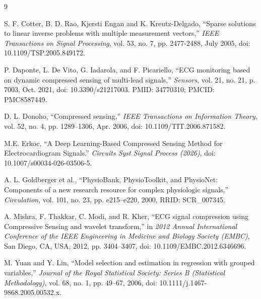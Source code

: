 \begin{thebibliography}{9}

S. F. Cotter, B. D. Rao, Kjersti Engan and K. Kreutz-Delgado, ``Sparse solutions to linear inverse problems with multiple measurement vectors,'' \textit{IEEE Transactions on Signal Processing}, vol. 53, no. 7, pp. 2477-2488, July 2005, doi: 10.1109/TSP.2005.849172.

P. Daponte, L. De Vito, G. Iadarola, and F. Picariello, ``ECG monitoring based on dynamic compressed sensing of multi-lead signals,'' \textit{Sensors}, vol. 21, no. 21, p. 7003, Oct. 2021, doi: 10.3390/s21217003. PMID: 34770310; PMCID: PMC8587449.

D. L. Donoho, ``Compressed sensing,'' \textit{IEEE Transactions on Information Theory}, vol. 52, no. 4, pp. 1289--1306, Apr. 2006, doi: 10.1109/TIT.2006.871582.

M.E. Erkoc, ``A Deep Learning-Based Compressed Sensing Method for Electrocardiogram Signals.'' \textit{Circuits Syst Signal Process (2026)}, doi: 10.1007/s00034-026-03506-5.

A. L. Goldberger et al., ``PhysioBank, PhysioToolkit, and PhysioNet: Components of a new research resource for complex physiologic signals,'' \textit{Circulation}, vol. 101, no. 23, pp. e215--e220, 2000, RRID: SCR\_007345.

A. Mishra, F. Thakkar, C. Modi, and R. Kher, ``ECG signal compression using Compressive Sensing and wavelet transform,'' in \textit{2012 Annual International Conference of the IEEE Engineering in Medicine and Biology Society (EMBC)}, San Diego, CA, USA, 2012, pp. 3404--3407, doi: 10.1109/EMBC.2012.6346696.

M. Yuan and Y. Lin, ``Model selection and estimation in regression with grouped variables,'' \textit{Journal of the Royal Statistical Society: Series B (Statistical Methodology)}, vol. 68, no. 1, pp. 49--67, 2006, doi: 10.1111/j.1467-9868.2005.00532.x.

\end{thebibliography}
